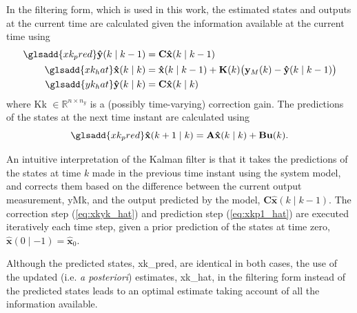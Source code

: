 In the filtering form, which is used in this work, the estimated states and outputs at the current time are calculated given the information available at the current time using
\begin{equation} \label{eq:xkyk_hat}
	\begin{aligned}
		\glsadd{xk_pred}\mathbf{\hat{y}}(k \mid k-1) &= \mathbf{C} \mathbf{\hat{x}}(k \mid k-1) \\
		\glsadd{xk_hat}\mathbf{\hat{x}}(k \mid k) &= \mathbf{\hat{x}}(k \mid k-1) + \mathbf{K}(k) \big( \mathbf{y}_M(k) - \mathbf{\hat{y}}(k \mid k-1)  \big) \\
		\glsadd{yk_hat}\mathbf{\hat{y}}(k \mid k) &= \mathbf{C} \mathbf{\hat{x}}(k \mid k)
	\end{aligned}
\end{equation}
where \gls{Kk} $\in \mathbb{R}^{n \times n_y}$ is a (possibly time-varying) correction gain. The predictions of the states at the next time instant are calculated using
\begin{equation} \label{eq:xkp1_hat}
	\glsadd{xk_pred}\mathbf{\hat{x}}(k+1 \mid k) = \mathbf{A} \mathbf{\hat{x}}(k \mid k) + \mathbf{B} \mathbf{u}(k).
\end{equation}

An intuitive interpretation of the Kalman filter is that it takes the predictions of the states at time $k$ made in the previous time instant using the system model, and corrects them based on the difference between the current output measurement, \gls{yMk}, and the output predicted by the model, $\mathbf{C} \mathbf{\hat{x}}(k \mid k-1)$. The correction step (\ref{eq:xkyk_hat}) and prediction step (\ref{eq:xkp1_hat}) are executed iteratively each time step, given a prior prediction of the states at time zero, $\mathbf{\hat{x}}(0 \mid -1)=\mathbf{\hat{x}}_0$.

Although the predicted states, \gls{xk_pred}, are identical in both cases, the use of the updated (i.e. \textit{a posteriori}) estimates, \gls{xk_hat}, in the filtering form instead of the predicted states leads to an optimal estimate taking account of all the information available.

